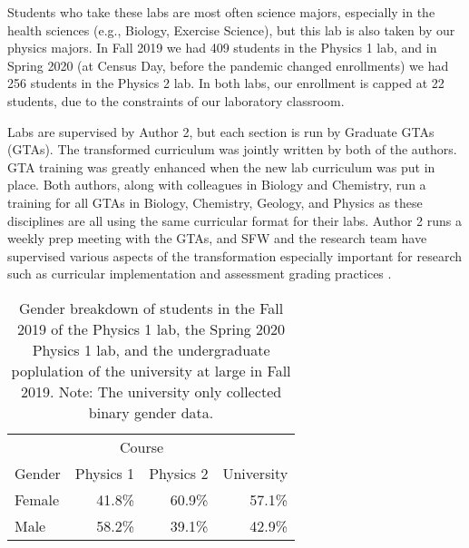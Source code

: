 \documentclass[aip, numerical, preprint]{revtex4-2}
\begin{document}
Students who take these labs are most often science majors, especially in the health sciences
(e.g., Biology, Exercise Science), but this lab is also taken by our physics majors.  In Fall
2019 we had 409 students in the Physics 1 lab, and in Spring 2020 (at Census Day, before the
pandemic changed enrollments) we had 256 students in the Physics 2 lab.  In both labs, our
enrollment is capped at 22 students, due to the constraints of our laboratory classroom.

Labs are supervised by Author 2, but each section is run by Graduate GTAs (GTAs). The
transformed curriculum was jointly written by both of the authors.  GTA training was greatly
enhanced when the new lab curriculum was put in place.  Both authors, along with colleagues in
Biology and Chemistry, run a training for all GTAs in Biology, Chemistry, Geology, and Physics
as these disciplines are all using the same curricular format for their labs.  Author 2 runs a
weekly prep meeting with the GTAs, and SFW and the research team have supervised various
aspects of the transformation especially important for research such as curricular
implementation \citep{SmithJoyner2020} and assessment grading practices \citep{Wolf2019}.


\begin{table}
  \centering
  \begin{tabular}{lrrr}
    \hline \hline
                &\multicolumn{2}{c}{Course}\\
    Gender	&Physics 1 &Physics 2 &University\\
    \hline
    Female	&41.8\%	   &60.9\%    &57.1\%\\
    Male	&58.2\%	   &39.1\%    &42.9\%\\
    \hline \hline
  \end{tabular}
  \caption{Gender breakdown of students in the Fall 2019 of the Physics 1 lab, the Spring 2020
    Physics 1 lab, and the undergraduate poplulation of the university at large in Fall 2019.
    Note: The university only collected binary gender data.}
  \label{tab:gender}
\end{table}
\end{document}
